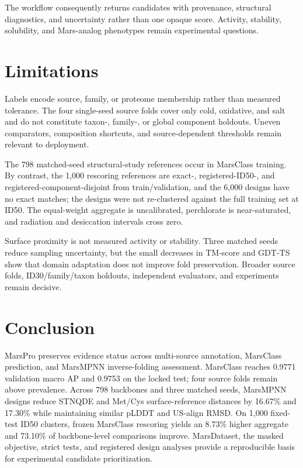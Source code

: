 \documentclass[conference]{IEEEtran}
\begin{document}
The workflow consequently returns candidates with provenance, structural diagnostics, and uncertainty rather than one opaque score. Activity, stability, solubility, and Mars-analog phenotypes remain experimental questions.

\section{Limitations}
Labels encode source, family, or proteome membership rather than measured tolerance. The four single-seed source folds cover only cold, oxidative, and salt and do not constitute taxon-, family-, or global component holdouts. Uneven comparators, composition shortcuts, and source-dependent thresholds remain relevant to deployment.

The 798 matched-seed structural-study references occur in MarsClass training. By contrast, the 1,000 rescoring references are exact-, registered-ID50-, and registered-component-disjoint from train/validation, and the 6,000 designs have no exact matches; the designs were not re-clustered against the full training set at ID50. The equal-weight aggregate is uncalibrated, perchlorate is near-saturated, and radiation and desiccation intervals cross zero.

Surface proximity is not measured activity or stability. Three matched seeds reduce sampling uncertainty, but the small decreases in TM-score and GDT-TS show that domain adaptation does not improve fold preservation. Broader source folds, ID30/family/taxon holdouts, independent evaluators, and experiments remain decisive.

\section{Conclusion}\label{sec:conclusion}
MarsPro preserves evidence status across multi-source annotation, MarsClass prediction, and MarsMPNN inverse-folding assessment. MarsClass reaches 0.9771 validation macro AP and 0.9753 on the locked test; four source folds remain above prevalence. Across 798 backbones and three matched seeds, MarsMPNN designs reduce STNQDE and Met/Cys surface-reference distances by 16.67\% and 17.30\% while maintaining similar pLDDT and US-align RMSD. On 1,000 fixed-test ID50 clusters, frozen MarsClass rescoring yields an 8.73\% higher aggregate and 73.10\% of backbone-level comparisons improve. MarsDataset, the masked objective, strict tests, and registered design analyses provide a reproducible basis for experimental candidate prioritization.
\end{document}
